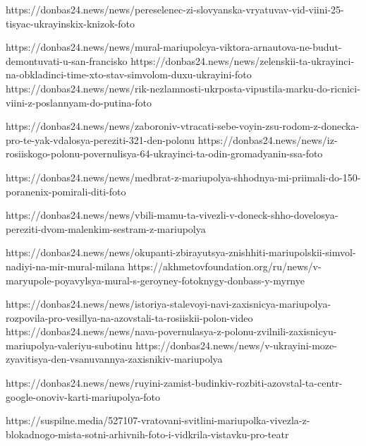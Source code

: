 https://donbas24.news/news/pereselenec-zi-slovyanska-vryatuvav-vid-viini-25-tisyac-ukrayinskix-knizok-foto

https://donbas24.news/news/mural-mariupolcya-viktora-arnautova-ne-budut-demontuvati-u-san-francisko
https://donbas24.news/news/zelenskii-ta-ukrayinci-na-obkladinci-time-xto-stav-simvolom-duxu-ukrayini-foto
https://donbas24.news/news/rik-nezlamnosti-ukrposta-vipustila-marku-do-ricnici-viini-z-poslannyam-do-putina-foto

https://donbas24.news/news/zaboroniv-vtracati-sebe-voyin-zsu-rodom-z-donecka-pro-te-yak-vdalosya-pereziti-321-den-polonu
https://donbas24.news/news/iz-rosiiskogo-polonu-povernulisya-64-ukrayinci-ta-odin-gromadyanin-ssa-foto

https://donbas24.news/news/medbrat-z-mariupolya-shhodnya-mi-priimali-do-150-poranenix-pomirali-diti-foto

https://donbas24.news/news/vbili-mamu-ta-vivezli-v-doneck-shho-dovelosya-pereziti-dvom-malenkim-sestram-z-mariupolya

https://donbas24.news/news/okupanti-zbirayutsya-znishhiti-mariupolskii-simvol-nadiyi-na-mir-mural-milana
https://akhmetovfoundation.org/ru/news/v-maryupole-poyavylsya-mural-s-geroyney-fotoknygy-donbass-y-myrnye

https://donbas24.news/news/istoriya-stalevoyi-navi-zaxisnicya-mariupolya-rozpovila-pro-vesillya-na-azovstali-ta-rosiiskii-polon-video
https://donbas24.news/news/nava-povernulasya-z-polonu-zvilnili-zaxisnicyu-mariupolya-valeriyu-subotinu
https://donbas24.news/news/v-ukrayini-moze-zyavitisya-den-vsanuvannya-zaxisnikiv-mariupolya

https://donbas24.news/news/ruyini-zamist-budinkiv-rozbiti-azovstal-ta-centr-google-onoviv-karti-mariupolya-foto


https://suspilne.media/527107-vratovani-svitlini-mariupolka-vivezla-z-blokadnogo-mista-sotni-arhivnih-foto-i-vidkrila-vistavku-pro-teatr

